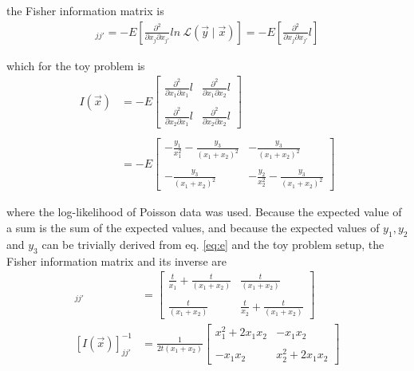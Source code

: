 \documentclass[report,12pt]{report}
\begin{document}
the Fisher information matrix is
\begin{align}
	[I(\vec x)]_{jj'}
	= -E\left[  
	\frac{\partial^2}{\partial x_j \partial x_{j'}} 
	ln\ \mathcal{L}(\vec y \mid \vec x)
	\right]
	= -E\left[  
	\frac{\partial^2}{\partial x_j \partial x_{j'}} 
	l
	\right]
\end{align}

which for the toy problem is
\begin{align}
	I(\vec x)
	&= -E\left[ \begin{array}{cc} 
	\frac{\partial^2}{\partial x_1 \partial x_1} l
	&
	\frac{\partial^2}{\partial x_1 \partial x_2} l
	\\
	\\
	\frac{\partial^2}{\partial x_2 \partial x_1} l
	&
	\frac{\partial^2}{\partial x_2 \partial x_2} l
	\end{array} \right]
	\nonumber\\
	\nonumber\\
	&= -E \left[ \begin{array}{cc} 
	-\frac{y_1}{x_1^2} - \frac{y_3}{(x_1 + x_2)^2}
	&
	-\frac{y_3}{(x_1+x_2)^2}
	\\
	\\
	-\frac{y_3}{(x_1+x_2)^2}
	&
	-\frac{y_2}{x_2^2} - \frac{y_3}{(x_1 + x_2)^2}
	\end{array} \right]
	\label{eq:fishermatrixtoy}
\end{align}

where the log-likelihood of Poisson data was used. Because the expected value of a sum is the sum of the expected values, and because the expected values of $y_1, y_2$ and $y_3$ can be trivially derived from eq. \ref{eq:e} and the toy problem setup, the Fisher information matrix and its inverse are
\begin{align}
	[I(\vec x)]_{jj'}
	&= \left[ \begin{array}{cc} 
	\frac{t}{x_1} + \frac{t}{(x_1 + x_2)}
	&
	\frac{t}{(x_1+x_2)}
	\\
	\\
	\frac{t}{(x_1+x_2)}
	&
	\frac{t}{x_2} + \frac{t}{(x_1 + x_2)}
	\end{array} \right]
	\nonumber\\
	[I(\vec x)]_{jj'}^{-1}
	&=
	\frac{1}{2t(x_1 + x_2)}
	\left[ \begin{array}{cc} 
	x_1^2 + 2 x_1 x_2
	&
	-x_1 x_2
	\\
	\\
	-x_1 x_2
	&
	x_2^2 + 2 x_1 x_2
	\end{array} \right]
	\label{eq:fisherInverseInformationMatrixToyML}
\end{align}
\end{document}
